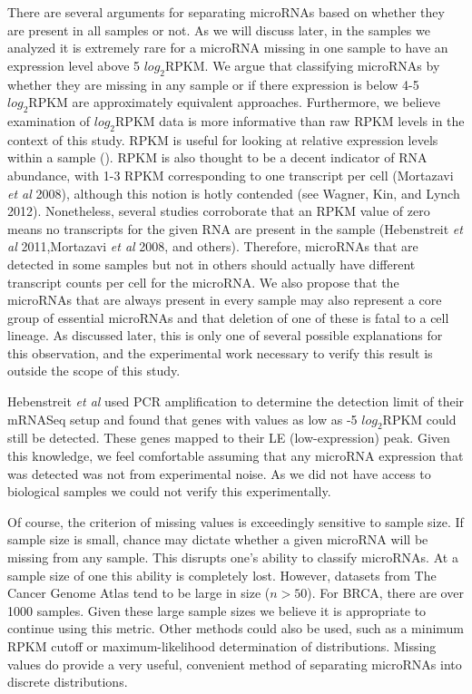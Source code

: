 \documentclass[12pt]{report}
\begin{document}
  There are several arguments for separating microRNAs based on whether they are present in all samples or not. As we will discuss later, in the samples we analyzed it is extremely rare
  for a microRNA missing in one sample to have an expression level above 5 $log_{2} \text{RPKM}$. We argue that classifying microRNAs by whether they are missing in any sample or if there expression
  is below 4-5 $log_{2} \text{RPKM}$ are approximately equivalent approaches. Furthermore, we believe examination of $log_{2} \text{RPKM}$ data is more informative than raw RPKM levels in the context
  of this study. RPKM is useful for looking at relative expression levels within a sample (). RPKM is also thought to be a decent indicator of RNA abundance, with 1-3 RPKM corresponding to one transcript
  per cell (Mortazavi \textit{et al} 2008), although this notion is hotly contended (see Wagner, Kin, and Lynch 2012). Nonetheless, several studies corroborate that an RPKM value of zero
  means no transcripts for the given RNA are present in the sample (Hebenstreit \textit{et al} 2011,Mortazavi \textit{et al} 2008, and others). Therefore, microRNAs that are detected in some samples but not
  in others should actually have different transcript counts per cell for the microRNA. We also propose that the microRNAs that are always present in every sample may also represent a core group of essential
  microRNAs and that deletion of one of these is fatal to a cell lineage. As discussed later, this is only one of several possible explanations for this observation, and the experimental work necessary
  to verify this result is outside the scope of this study. %
  
  
  Hebenstreit \textit{et al} used PCR amplification to determine the detection limit of their mRNASeq setup and found that
  genes with values as low as -5 $log_{2} \text{RPKM}$ could still be detected. These genes mapped to their LE (low-expression) peak. Given this knowledge, we feel comfortable assuming that any microRNA expression that was detected
  was not from experimental noise. As we did not have access to biological samples we could not verify this experimentally.
  
  Of course, the criterion of missing values is exceedingly sensitive to sample size. If sample size is small, chance may dictate whether a given microRNA will be missing from any sample. This disrupts one's ability
  to classify microRNAs. At a sample size of one this ability is completely lost. However, datasets from The Cancer Genome Atlas tend to be large in size ($n > 50$). For BRCA, there are over 1000 samples. Given these
  large sample sizes we believe it is appropriate to continue using this metric. Other methods could also be used, such as a minimum RPKM cutoff or maximum-likelihood determination of distributions. Missing values
  do provide a very useful, convenient method of separating microRNAs into discrete distributions. %
  
\end{document}
